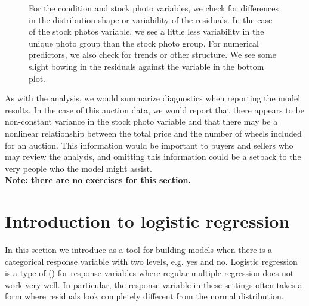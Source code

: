 \begin{description}
\begin{figure}
  \centering
  \caption{For the condition and stock photo variables,
      we check
      for differences in the distribution shape
      or variability of
      the residuals.
      In the case of the stock photos variable,
      we see a little
      less variability in the unique photo group
      than the stock
      photo group.
      For numerical predictors, we also check for
      trends or other structure.
      We see some slight bowing in the residuals against the
       variable in the bottom plot.}
  \label{mkDiagnosticEvsVariables}
\end{figure}

\end{description}

As with the  analysis, we would summarize
diagnostics when reporting the model results.
In the case of this auction data,
we would report that there appears to be non-constant variance
in the stock photo variable and that there may be a nonlinear
relationship between the total price and the number of wheels
included for an auction.
This information would be important to buyers and sellers who
may review the analysis, and omitting this information could be
a setback to the very people who the model might assist. \\

\noindent%
\textbf{Note: there are no exercises for this section.}




\section{Introduction to logistic regression}
\label{logisticRegression}


\noindent%
In this section we introduce
as a tool for building models when there is a categorical
response variable with two levels, e.g. yes and no.
Logistic regression is a type of
 ()
for response variables
where regular multiple regression does not work very well.
In particular, the response variable in these settings often
takes a form where residuals look completely different from
the normal distribution.

